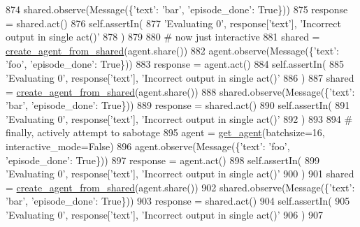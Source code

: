 \begin{DoxyCode}
874         shared.observe(Message(\{\textcolor{stringliteral}{'text'}: \textcolor{stringliteral}{'bar'}, \textcolor{stringliteral}{'episode\_done'}: \textcolor{keyword}{True}\}))
875         response = shared.act()
876         self.assertIn(
877             \textcolor{stringliteral}{'Evaluating 0'}, response[\textcolor{stringliteral}{'text'}], \textcolor{stringliteral}{'Incorrect output in single act()'}
878         )
879 
880         \textcolor{comment}{# now just interactive}
881         shared = \hyperlink{namespaceparlai_1_1core_1_1agents_aa5af5dd1d2f9da491b60348d479b849f}{create\_agent\_from\_shared}(agent.share())
882         agent.observe(Message(\{\textcolor{stringliteral}{'text'}: \textcolor{stringliteral}{'foo'}, \textcolor{stringliteral}{'episode\_done'}: \textcolor{keyword}{True}\}))
883         response = agent.act()
884         self.assertIn(
885             \textcolor{stringliteral}{'Evaluating 0'}, response[\textcolor{stringliteral}{'text'}], \textcolor{stringliteral}{'Incorrect output in single act()'}
886         )
887         shared = \hyperlink{namespaceparlai_1_1core_1_1agents_aa5af5dd1d2f9da491b60348d479b849f}{create\_agent\_from\_shared}(agent.share())
888         shared.observe(Message(\{\textcolor{stringliteral}{'text'}: \textcolor{stringliteral}{'bar'}, \textcolor{stringliteral}{'episode\_done'}: \textcolor{keyword}{True}\}))
889         response = shared.act()
890         self.assertIn(
891             \textcolor{stringliteral}{'Evaluating 0'}, response[\textcolor{stringliteral}{'text'}], \textcolor{stringliteral}{'Incorrect output in single act()'}
892         )
893 
894         \textcolor{comment}{# finally, actively attempt to sabotage}
895         agent = \hyperlink{namespacetests_1_1test__torch__agent_ae929d109305aaea29fbfa13ecf1f32e9}{get\_agent}(batchsize=16, interactive\_mode=\textcolor{keyword}{False})
896         agent.observe(Message(\{\textcolor{stringliteral}{'text'}: \textcolor{stringliteral}{'foo'}, \textcolor{stringliteral}{'episode\_done'}: \textcolor{keyword}{True}\}))
897         response = agent.act()
898         self.assertIn(
899             \textcolor{stringliteral}{'Evaluating 0'}, response[\textcolor{stringliteral}{'text'}], \textcolor{stringliteral}{'Incorrect output in single act()'}
900         )
901         shared = \hyperlink{namespaceparlai_1_1core_1_1agents_aa5af5dd1d2f9da491b60348d479b849f}{create\_agent\_from\_shared}(agent.share())
902         shared.observe(Message(\{\textcolor{stringliteral}{'text'}: \textcolor{stringliteral}{'bar'}, \textcolor{stringliteral}{'episode\_done'}: \textcolor{keyword}{True}\}))
903         response = shared.act()
904         self.assertIn(
905             \textcolor{stringliteral}{'Evaluating 0'}, response[\textcolor{stringliteral}{'text'}], \textcolor{stringliteral}{'Incorrect output in single act()'}
906         )
907 
\end{DoxyCode}
